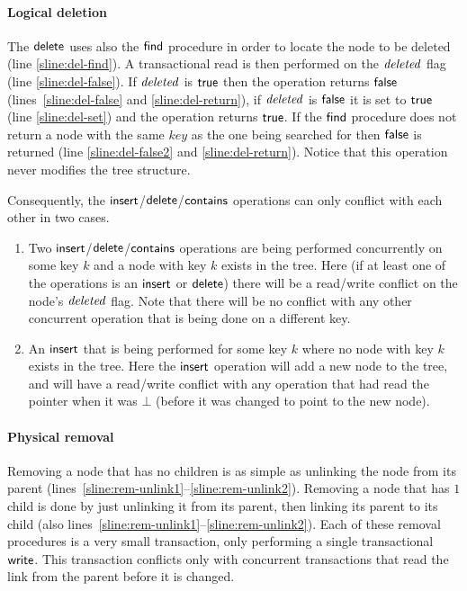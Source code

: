 \paragraph{Logical deletion} The $\act{delete}$ uses also the $\act{find}$ procedure in order to locate the node to be deleted (line \ref{sline:del-find}).
A transactional read is then performed on the $\ms{deleted}$ flag (line \ref{sline:del-false}).
If $\ms{deleted}$ is $\lit{true}$ then the operation returns $\lit{false}$ (lines~\ref{sline:del-false} and \ref{sline:del-return}), if $\ms{deleted}$
is $\lit{false}$ it is set to $\lit{true}$ (line \ref{sline:del-set}) and the operation returns $\lit{true}$.
If the $\act{find}$ procedure does not return a node with the same $key$ as the one being searched for then $\lit{false}$ is returned (line \ref{sline:del-false2} and \ref{sline:del-return}).
Notice that this operation never modifies the tree structure.

Consequently, the $\act{insert}$/$\act{delete}$/$\act{contains}$ operations can only conflict with each other in two cases.
\begin{enumerate}
  \item Two $\act{insert}$/$\act{delete}$/$\act{contains}$ operations are being performed concurrently on some key $k$ and a node with key $k$ exists in the tree.
	Here (if at least one of the operations is an $\act{insert}$ or $\act{delete}$) there will be a read/write conflict on the node's $\ms{deleted}$ flag.
	Note that there will be no conflict with any other concurrent operation that is being done on a different key.
  \item An $\act{insert}$ that is being performed for some key $k$ where no node with key $k$ exists in the tree.
	Here the $\act{insert}$ operation will add a new node to the tree, and will have a read/write conflict with any operation that had read
	the pointer when it was $\bot$ (before it was changed to point to the new node).
\end{enumerate}

%



\paragraph{Physical removal}
Removing a node that has no children is as simple as unlinking the node from its parent (lines~\ref{sline:rem-unlink1}--\ref{sline:rem-unlink2}).
Removing a node that has $1$ child is done by just unlinking it from its parent, then linking its parent to its child (also lines~\ref{sline:rem-unlink1}--\ref{sline:rem-unlink2}).
Each of these removal procedures is a very small transaction, only performing a single transactional $\act{write}$.
This transaction conflicts only with concurrent transactions that read the link from the parent before it is changed.

